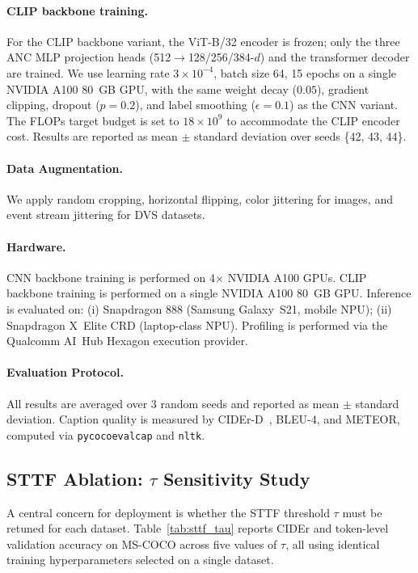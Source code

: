 \documentclass{article}
\begin{document}
\paragraph{CLIP backbone training.}
For the CLIP backbone variant, the ViT-B/32 encoder is frozen; only the three ANC MLP projection heads (512$\to$128/256/384-$d$) and the transformer decoder are trained. We use learning rate $3\times10^{-4}$, batch size 64, 15 epochs on a single NVIDIA A100 80~GB GPU, with the same weight decay ($0.05$), gradient clipping, dropout ($p=0.2$), and label smoothing ($\epsilon=0.1$) as the CNN variant. The FLOPs target budget is set to $18\times10^{9}$ to accommodate the CLIP encoder cost. Results are reported as mean $\pm$ standard deviation over seeds \{42, 43, 44\}.

\paragraph{Data Augmentation.}
We apply random cropping, horizontal flipping, color jittering for images,
and event stream jittering for DVS datasets.
\paragraph{Hardware.}
CNN backbone training is performed on 4$\times$ NVIDIA A100 GPUs.
CLIP backbone training is performed on a single NVIDIA A100 80~GB GPU.
Inference is evaluated on:
(i) Snapdragon 888 (Samsung Galaxy~S21, mobile NPU);
(ii) Snapdragon X~Elite CRD (laptop-class NPU).
Profiling is performed via the Qualcomm AI~Hub Hexagon execution provider.

\paragraph{Evaluation Protocol.}
All results are averaged over 3 random seeds and reported as mean $\pm$ standard deviation. Caption quality is measured by CIDEr-D~\cite{karpathy2015deepvs}, BLEU-4, and METEOR, computed via \texttt{pycocoevalcap} and \texttt{nltk}.

\subsection{STTF Ablation: $\tau$ Sensitivity Study}

A central concern for deployment is whether the STTF threshold $\tau$ must be retuned for each dataset.
Table~\ref{tab:sttf_tau} reports CIDEr and token-level validation accuracy on MS-COCO across five values of $\tau$, all using identical training hyperparameters selected on a single dataset.
\end{document}
